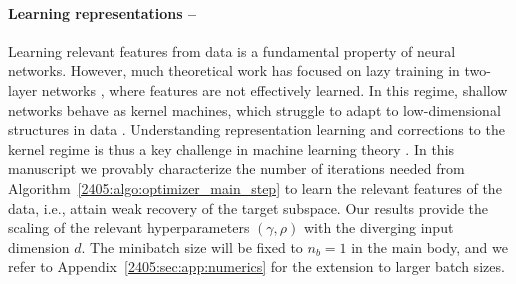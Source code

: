 \paragraph{Learning representations --}
Learning relevant features from data is a fundamental property of neural networks. However, much theoretical work has focused on lazy training in two-layer networks \citep{jacot2018neural}, where features are not effectively learned. In this regime, shallow networks behave as kernel machines, which struggle to adapt to low-dimensional structures in data \citep{ghorbani2020when}. Understanding representation learning and corrections to the kernel regime is thus a key challenge in machine learning theory \citep{dudeja2018learning,atanasov2022neural,bietti2022learning,damian2022neural,petrini2022learning}. In this manuscript we provably characterize the number of iterations needed from Algorithm~\ref{2405:algo:optimizer_main_step} to learn the relevant features of the data, i.e., attain weak recovery of the target subspace. Our results provide the scaling of the relevant hyperparameters $(\gamma, \rho)$ with the diverging input dimension $d$. The minibatch size will be fixed to $n_b =1$ in the main body, and we refer to Appendix~\ref{2405:sec:app:numerics} for the extension to larger batch sizes.


